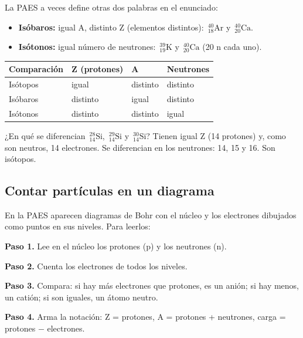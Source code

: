 La PAES a veces define otras dos palabras en el enunciado:

 
\begin{itemize}
  \item \textbf{Isóbaros:} igual A, distinto Z (elementos distintos): $\,{}^{40}_{18}\text{Ar}$ y $\,{}^{40}_{20}\text{Ca}$.
  \item \textbf{Isótonos:} igual número de neutrones: $\,{}^{39}_{19}\text{K}$ y $\,{}^{40}_{20}\text{Ca}$ (20 n cada uno).
\end{itemize}
  
\begin{center}\small
\begin{tabular}{@{}llll@{}}
\toprule
\textbf{Comparación} & \textbf{Z (protones)} & \textbf{A} & \textbf{Neutrones} \\
\midrule
Isótopos & igual & distinto & distinto \\
Isóbaros & distinto & igual & distinto \\
Isótonos & distinto & distinto & igual \\
\bottomrule
\end{tabular}
\end{center}
 
\begin{ejemplo} ¿En qué se diferencian $\,{}^{28}_{14}\text{Si}$, $\,{}^{29}_{14}\text{Si}$ y $\,{}^{30}_{14}\text{Si}$? Tienen igual Z (14 protones) y, como son neutros, 14 electrones. Se diferencian en los neutrones: 14, 15 y 16. Son isótopos.\end{ejemplo}
\subsection{Contar partículas en un diagrama}
En la PAES aparecen diagramas de Bohr con el núcleo y los electrones dibujados como puntos en sus niveles. Para leerlos:

 

\textbf{Paso 1.} Lee en el núcleo los protones (p) y los neutrones (n).

 

\textbf{Paso 2.} Cuenta los electrones de todos los niveles.

 

\textbf{Paso 3.} Compara: si hay más electrones que protones, es un anión; si hay menos, un catión; si son iguales, un átomo neutro.

 

\textbf{Paso 4.} Arma la notación: Z = protones, A = protones + neutrones, carga = protones \ensuremath{-} electrones.

